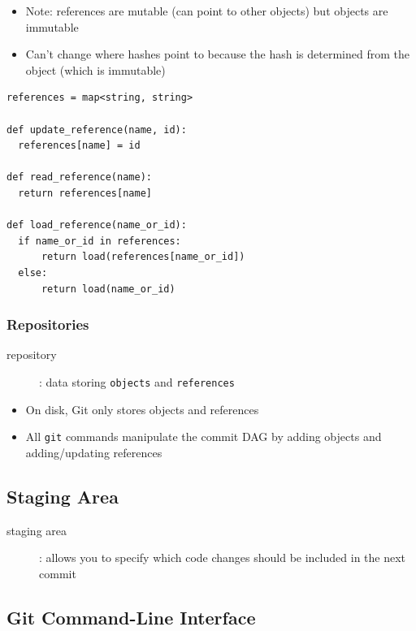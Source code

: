 \documentclass[letterpaper,12pt]{article}
\begin{document}
\begin{itemize}
 \item Note: references are mutable (can point to other objects) but objects are immutable
 \item Can't change where hashes point to because the hash is determined from the object (which is immutable)
\end{itemize}

\begin{lstlisting}
references = map<string, string>

def update_reference(name, id):
  references[name] = id

def read_reference(name):
  return references[name]

def load_reference(name_or_id):
  if name_or_id in references:
      return load(references[name_or_id])
  else:
      return load(name_or_id)
\end{lstlisting}

\subsubsection{Repositories}
\begin{description}
 \item[repository]: data storing \lstinline{objects} and \lstinline{references}
\end{description}

\begin{itemize}
 \item On disk, Git only stores objects and references
 \item All \lstinline{git} commands manipulate the commit DAG by adding objects and adding/updating references
\end{itemize}

\subsection{Staging Area}
\begin{description}
 \item[staging area]: allows you to specify which code changes should be included in the next commit
\end{description}

\subsection{Git Command-Line Interface}
\end{document}
